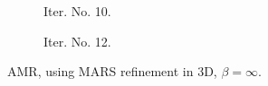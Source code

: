 \documentclass[a4paper,12pt]{amsart}
\numberwithin{equation}{section}
\begin{document}
\begin{figure}[h!]
\begin{subfigure}[t]{0.49\textwidth}
    \caption{Iter. No. 10.}
\end{subfigure}
	\hfill
\begin{subfigure}[t]{0.49\textwidth}
    \caption{Iter. No. 12.}
\end{subfigure}

\caption{AMR, using MARS refinement in 3D, $\beta = \infty$.}
\label{fig:amr_trans3D_paraview_mars}
\end{figure}
\end{document}
